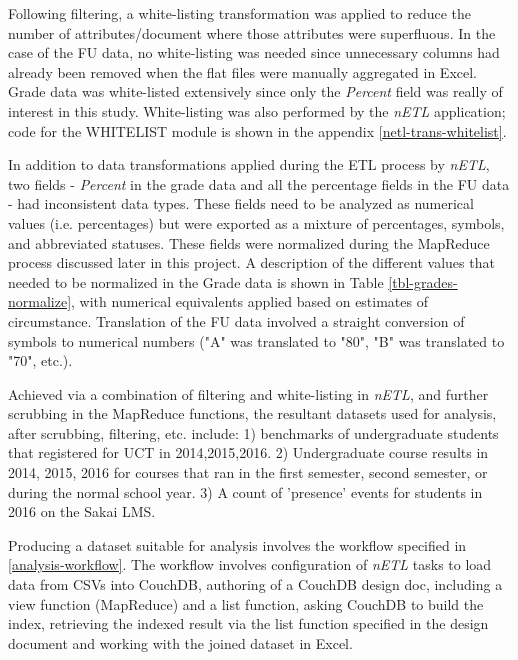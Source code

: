 Following filtering, a white-listing transformation was applied to reduce the number of attributes/document where those attributes were superfluous. In the case of the FU data, no white-listing was needed since unnecessary columns had already been removed when the flat files were manually aggregated in Excel. Grade data was white-listed extensively since only the \textit{Percent} field was really of interest in this study. White-listing was also performed by the \textit{nETL} application; code for the WHITELIST module is shown in the appendix \ref{netl-trans-whitelist}.


In addition to data transformations applied during the ETL process by \textit{nETL}, two fields - \textit{Percent} in the grade data and all the percentage fields in the FU data - had inconsistent data types. These fields need to be analyzed as numerical values (i.e. percentages) but were exported as a mixture of percentages, symbols, and abbreviated statuses. These fields were normalized during the MapReduce process discussed later in this project. A description of the different values that needed to be normalized in the Grade data is shown in Table \ref{tbl-grades-normalize}, with numerical equivalents applied based on estimates of circumstance. Translation of the FU data involved a straight conversion of symbols to numerical numbers ("A" was translated to "80", "B" was translated to "70", etc.).



Achieved via a combination of filtering and white-listing in \textit{nETL}, and further scrubbing in the MapReduce functions, the resultant datasets used for analysis, after scrubbing, filtering, etc. include: 1) benchmarks of undergraduate students that registered for UCT in 2014,2015,2016. 2) Undergraduate course results in 2014, 2015, 2016 for courses that ran in the first semester, second semester, or during the normal school year. 3) A count of 'presence' events for students in 2016 on the Sakai LMS.

Producing a dataset suitable for analysis involves the workflow specified in \ref{analysis-workflow}. The workflow involves configuration of \textit{nETL} tasks to load data from CSVs into CouchDB, authoring of a CouchDB design doc, including a view function (MapReduce) and a list function, asking CouchDB to build the index, retrieving the indexed result via the list function specified in the design document and working with the joined dataset in Excel.

